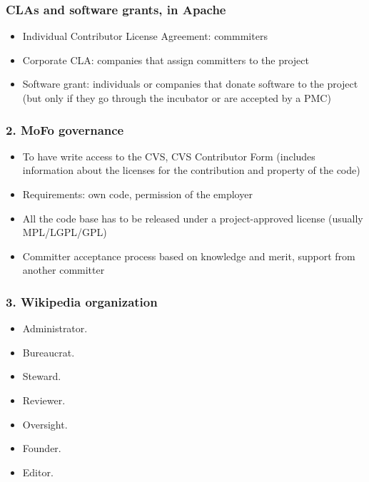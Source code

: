 \documentclass{beamer}
\begin{document}

\begin{frame}
\frametitle{CLAs and software grants, in Apache}

\begin{itemize}
\item Individual Contributor License Agreement: commmiters
\item Corporate CLA: companies that assign committers to the project
\item Software grant: individuals or companies that donate software to the
project (but only if they go through the incubator or are accepted by a PMC)
\end{itemize}

\end{frame}


\begin{frame}
 \frametitle{2. MoFo governance}
 \begin{itemize}
  \item To have write access to the CVS, CVS Contributor Form 
(includes information about the licenses for the contribution and property of the code)
  \item Requirements: own code, permission of the employer
  \item All the code base has to be released under a project-approved license (usually MPL/LGPL/GPL)
  \item Committer acceptance process based on knowledge and merit, support from another committer
 \end{itemize}

\end{frame}


\begin{frame}
 \frametitle{3. Wikipedia organization}
 \begin{itemize}
  \item Administrator.
  \item Bureaucrat.
  \item Steward.
  \item Reviewer.
  \item Oversight.
  \item Founder.
  \item Editor.
 \end{itemize}

\end{frame}
\end{document}
